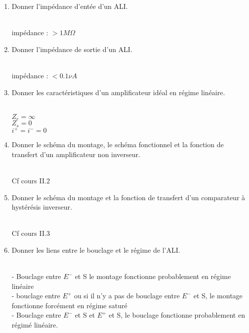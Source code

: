 \begin{enumerate}[label=\arabic{enumi} - , left=0pt, itemsep=1em]
    \item Donner l'impédance d'entée d'un ALI. \par
    \begin{solution}\\
        impédance : $> 1 M \Omega$
    \end{solution}

    \item Donner l'impédance de sortie d'un ALI. \par
    \begin{solution}\\
        impédance : $< 0.1 \nu A$
    \end{solution}

    \item Donner les caractéristiques d'un amplificateur idéal en régime linéaire. \par
    \begin{solution}\\
        $Z_e = \infty$\\
        $Z_s = 0$\\
        $i^+ = i^- = 0$
    \end{solution}

    \item Donner le schéma du montage, le schéma fonctionnel et la fonction de transfert d'un amplificateur non inverseur. \par
    \begin{solution}\\
        Cf cours II.2
    \end{solution}


    \item Donner le schéma du montage et la fonction de transfert d'un comparateur à hystérésis inverseur. \par
    \begin{solution}\\
        Cf cours II.3
    \end{solution}

    \item Donner les liens entre le bouclage et le régime de l'ALI. \par
    \begin{solution}\\
        - Bouclage entre $E^-$ et S le montage fonctionne probablement en régime linéaire\\
        - bouclage entre $E^+$ ou si il n'y a pas de bouclage entre $E^-$ et S, le montage fonctionne forcément en régime saturé\\
        - Bouclage entre $E^-$ et S et $E^+$ et S, le bouclage fonctionne probablement en régimé linéaire.


\end{solution}
\end{enumerate}

